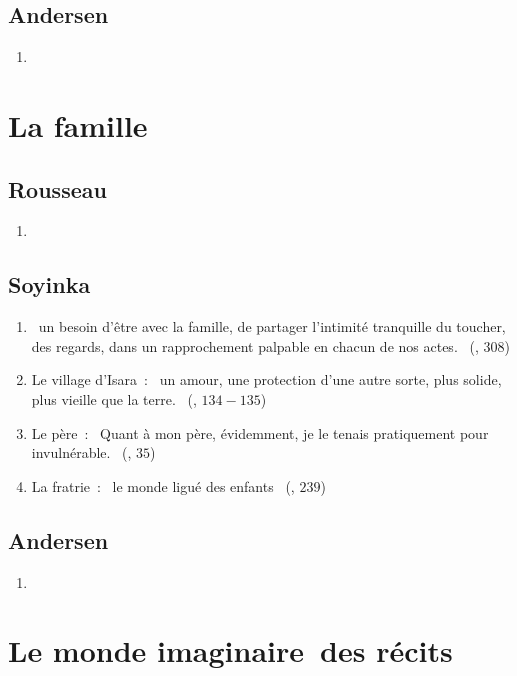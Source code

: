 \documentclass[a4paper, 11pt, hidelinks]{article}
\newcommand{\rb}[1]{\Romanbar{#1}}
\begin{document}
\subsection{Andersen}


\begin{enumerate}
    \item 
\end{enumerate}

\section{La famille}


\subsection{Rousseau}

\begin{enumerate}
    \item 
\end{enumerate}


\subsection{Soyinka}


\begin{enumerate}
    \item \og{} un besoin d’être avec la famille, de partager l’intimité tranquille du toucher, des regards, dans un rapprochement palpable en chacun de nos actes. \fg{} (\rb{11}, $308$)
    \item Le village d’Isara : \og{} un amour, une protection d’une autre sorte, plus solide, plus vieille que la terre. \fg{} (\rb{5}, $134-135$)
    \item Le père : \og{} Quant à mon père, évidemment, je le tenais pratiquement pour invulnérable. \fg{} (\rb{1}, $35$)
    \item La fratrie : \og{} le monde ligué des enfants \fg{} (\rb{8}, $239$)
\end{enumerate}


\subsection{Andersen}


\begin{enumerate}
    \item 
\end{enumerate}

\section{Le monde imaginaire des récits}
\end{document}

